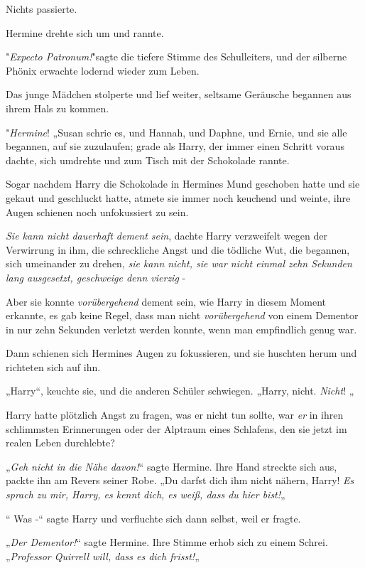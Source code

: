 {Nichts passierte.

Hermine drehte sich um und rannte.

"\emph{Expecto Patronum!}"sagte die tiefere Stimme des Schulleiters, und der silberne Phönix erwachte lodernd wieder zum Leben.

Das junge Mädchen stolperte und lief weiter, seltsame Geräusche begannen aus ihrem Hals zu kommen.

"\emph{Hermine}! „Susan schrie es, und Hannah, und Daphne, und Ernie, und sie alle begannen, auf sie zuzulaufen; grade als Harry, der immer einen Schritt voraus dachte, sich umdrehte und zum Tisch mit der Schokolade rannte.

Sogar nachdem Harry die Schokolade in Hermines Mund geschoben hatte und sie gekaut und geschluckt hatte, atmete sie immer noch keuchend und weinte, ihre Augen schienen noch unfokussiert zu sein.

\emph{Sie kann nicht dauerhaft dement sein}, dachte Harry verzweifelt wegen der Verwirrung in ihm, die schreckliche Angst und die tödliche Wut, die begannen, sich umeinander zu drehen, \emph{sie kann nicht, sie war nicht einmal zehn Sekunden lang ausgesetzt, geschweige denn vierzig} -

Aber sie konnte \emph{vorübergehend} dement sein, wie Harry in diesem Moment erkannte, es gab keine Regel, dass man nicht \emph{vorübergehend} von einem Dementor in nur zehn Sekunden verletzt werden konnte, wenn man empfindlich genug war.

Dann schienen sich Hermines Augen zu fokussieren, und sie huschten herum und richteten sich auf ihn.

„Harry“, keuchte sie, und die anderen Schüler schwiegen. „Harry, nicht. \emph{Nicht}! „

Harry hatte plötzlich Angst zu fragen, was er nicht tun sollte, war \emph{er} in ihren schlimmsten Erinnerungen oder der Alptraum eines Schlafens, den sie jetzt im realen Leben durchlebte?

„\emph{Geh nicht in die Nähe davon!}“ sagte Hermine. Ihre Hand streckte sich aus, packte ihn am Revers seiner Robe. „Du darfst dich ihm nicht nähern, Harry! \emph{Es sprach zu mir, Harry, es kennt dich, es weiß, dass du hier bist!}„

“ Was -“ sagte Harry und verfluchte sich dann selbst, weil er fragte.

„\emph{Der Dementor!}“ sagte Hermine. Ihre Stimme erhob sich zu einem Schrei. „\emph{Professor Quirrell will, dass es dich frisst!}„

}
